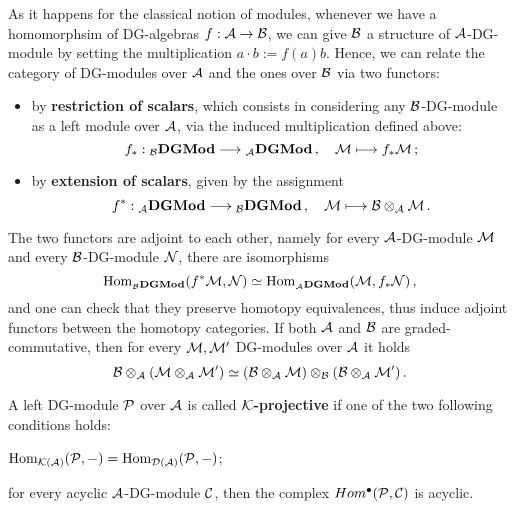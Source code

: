 	As it happens for the classical notion of modules,
	whenever we have a homomorphsim of DG-algebras $f:\mathcal{A} \to \mathcal{B}$,
	we can give $\mathcal{B}$ a structure of $\mathcal{A}$-DG-module by setting the multiplication
	$a \cdot b := f(a)b$. Hence, we can relate the category of DG-modules over
	$\mathcal{A}$ and the ones over $\mathcal{B}$ via two functors:
	\begin{itemize}
		\item by \textbf{restriction of scalars}, which consists in considering
		any $\mathcal{B}$-DG-module as a left module over $\mathcal{A}$, via the induced
		multiplication defined above:
		\begin{equation*}
			f_{*}:{}_{\mathcal{B}}{\normalfont\textbf{DGMod}} \longrightarrow {}_{\mathcal{A}}{\normalfont\textbf{DGMod}}\,,
			\quad \mathcal{M} \longmapsto f_{*}\mathcal{M}\,;
		\end{equation*}
		
		\item by \textbf{extension of scalars}, given by the assignment
		\begin{equation*}
			f^{*}:{}_{\mathcal{A}}{\normalfont\textbf{DGMod}} \longrightarrow {}_{\mathcal{B}}{\normalfont\textbf{DGMod}}\,,
			\quad \mathcal{M} \longmapsto \mathcal{B} \otimes_{\mathcal{A}} \mathcal{M}\,.
		\end{equation*}
	\end{itemize}
	The two functors are adjoint to each other, 
	namely for every $\mathcal{A}$-DG-module $\mathcal{M}$
	and every $\mathcal{B}$-DG-module $\mathcal{N}$, 
	there are isomorphisms
	\begin{equation*}
		\operatorname{Hom}_{{}_{\mathcal{B}}{\normalfont\textbf{DGMod}}}(f^{*}\mathcal{M},\mathcal{N}) \simeq \operatorname{Hom}_{{}_{\mathcal{A}}{\normalfont\textbf{DGMod}}}(\mathcal{M},f_{*}\mathcal{N})\,,
	\end{equation*}
	and one can check that they preserve homotopy equivalences, 
	thus induce adjoint functors between the homotopy categories.
	If both $\mathcal{A}$ and $\mathcal{B}$ are graded-commutative, then
	for every $\mathcal{M}, \mathcal{M}'$ DG-modules over $\mathcal{A}$ it holds
	\begin{equation*}
		\mathcal{B} \otimes_{\mathcal{A}} (\mathcal{M} \otimes_{\mathcal{A}} \mathcal{M}')
		\simeq (\mathcal{B} \otimes_{\mathcal{A}} \mathcal{M}) \otimes_{\mathcal{B}} (\mathcal{B} \otimes_{\mathcal{A}} \mathcal{M}')\,.
	\end{equation*}
	
	\begin{df}
		A left DG-module $\mathcal{P}$ over $\mathcal{A}$ is called \textbf{$\mathcal{K}$-projective}
		if one of the two following conditions holds:
		\begin{rmnumerate}
			\item $\operatorname{Hom}_{\mathcal{K}(\mathcal{A})}(\mathcal{P},-) = \operatorname{Hom}_{\mathcal{D}(\mathcal{A})}(\mathcal{P},-)$;
			\item for every acyclic $\mathcal{A}$-DG-module $\mathcal{C}$, 
			then the complex $Hom^{\bullet}(\mathcal{P},\mathcal{C})$ is acyclic.
		\end{rmnumerate}
	\end{df}
	
